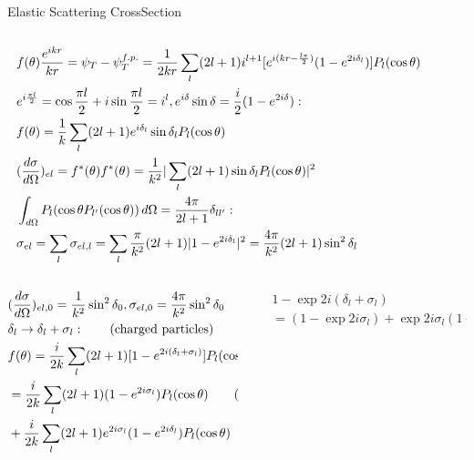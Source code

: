 \begin{frame}{Elastic Scattering CrossSection}
    \begin{columns}[T]
        \begin{column}{0.7\textwidth}
            \begin{align*}
                &f(\theta)\frac{e^{ikr}}{kr}=\psi_T-\psi_T^{f.p.}=\frac{1}{2kr}\sum_l(2l+1)i^{l+1}[e^{i(kr-\frac{l\pi}{2})}(1-e^{2i\delta_l})]P_l(\cos{\theta})\\
                &e^{i \frac{\pi l}{2}}=\cos{\frac{\pi l}{2}}+i\sin{\frac{\pi l}{2}}=i^l, e^{i\delta}\sin{\delta}=\frac{i}{2}(1-e^{2i\delta}):\\
                &f(\theta)=\frac{1}{k}\sum_l(2l+1)e^{i\delta_l}\sin{\delta_l}P_l(\cos{\theta})\\
                &(\frac{d \sigma}{d \Omega})_{el}=f^*(\theta)f^*(\theta)=\frac{1}{k^2}|\sum_l(2l+1)\sin{\delta_l}P_l(\cos{\theta})|^2\\
                &\int_{d\Omega}P_l(\cos{\theta}P_{l'}(\cos{\theta}))\,d\Omega=\frac{4\pi}{2l+1}\delta_{ll'}:\\
                &\sigma_{el}=\sum_l\sigma_{el,l}=\sum_l \frac{\pi}{k^2}(2l+1)|1-e^{2i\delta_l}|^2=\frac{4\pi}{k^2}(2l+1)\sin^2{\delta_l}
            \end{align*}
        \end{column}
        \begin{column}{0.3\textwidth}
        \end{column}
    \end{columns}
    \begin{columns}[T]
        \begin{column}{0.6\textwidth}
            \begin{align*}
                &(\frac{d \sigma}{d \Omega})_{el,0}=\frac{1}{k^2}\sin^2{\delta_0},\sigma_{el,0}=\frac{4\pi}{k^2}\sin^2{\delta_0}\\
                &\delta_l\to\delta_l+\sigma_l:\tag{charged particles}\\
                &f(\theta)=\frac{i}{2k}\sum_l(2l+1)[1-e^{2i(\delta_l+\sigma_l)}]P_l(\cos{\theta})\\
                &=\frac{i}{2k}\sum_l(2l+1)(1-e^{2i\sigma_l})P_l(\cos{\theta})\tag{Rutherford s.}\\
                &+\frac{i}{2k}\sum_l(2l+1)e^{2i\sigma_l}(1-e^{2i\delta_l})P_l(\cos{\theta})\tag{N+C}
            \end{align*}
        \end{column}
        \begin{column}{0.4\textwidth}
            \begin{align*}
                &1-\exp{2i(\delta_l+\sigma_l)}\\
                &=(1-\exp{2i\sigma_l})+\exp{2i\sigma_l}(1-\exp{2i\delta_l})
            \end{align*}
        \end{column}
    \end{columns}
    
\end{frame}

